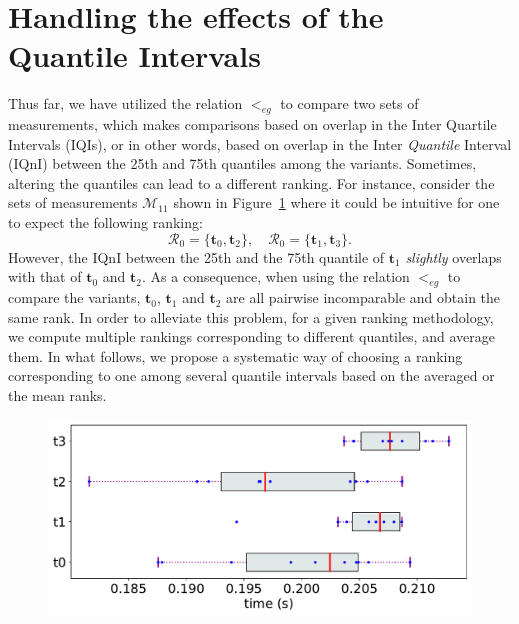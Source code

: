\documentclass[acmsmall,screen, review]{acmart}
\begin{document}
\section{Handling the effects of the Quantile Intervals }
\label{sec3:handlingq}
Thus far, we have utilized the relation $<_{eg}$ to compare two sets of measurements, which makes comparisons based on overlap in the Inter Quartile Intervals (IQIs), or in other words,  based on overlap in the Inter \textit{Quantile} Interval (IQnI) between the 25th and 75th quantiles among the variants. Sometimes, altering the quantiles can lead to a different ranking. 
For instance, consider the sets of measurements $\mathcal{M}_{11}$ shown in Figure~\ref{fig:rel-eg} where it could be intuitive for one to expect the following ranking:
\begin{equation}
\label{eq:rel-rank}
\mathcal{R}_0 =\{ \mathbf{t}_0, \mathbf{t}_2 \}, \quad \mathcal{R}_0 =\{ \mathbf{t}_1, \mathbf{t}_3 \}.
\end{equation}
However, the IQnI between the 25th and the 75th quantile  of $\mathbf{t}_1$ \textit{slightly} overlaps with that of $\mathbf{t}_0$ and $\mathbf{t}_2$. As a consequence, when using the relation $<_{eg}$ to compare the variants,  $\mathbf{t}_0$, $\mathbf{t}_1$ and $\mathbf{t}_2$ are all pairwise incomparable and obtain the same rank.
In order to alleviate this problem, for a given ranking methodology, we compute multiple rankings corresponding to different quantiles, and average them. In what follows, we propose a systematic way of choosing a ranking corresponding to one among several quantile intervals based on the averaged or the mean ranks. 
\begin{figure}
	\centering
	\includegraphics[width=0.6\linewidth]{fig/ch3/mean-rank-eg}
	\label{fig:rel-eg}
\end{figure}
\end{document}
